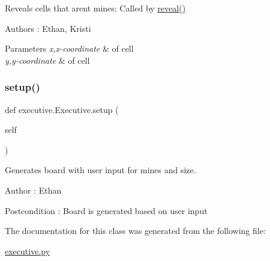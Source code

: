Reveals cells that aren\textquotesingle{}t mines; Called by \mbox{\hyperlink{classexecutive_1_1_executive_a6c8b73fd28d41e64cbd8b259d3c92ae8}{reveal()}} 

\begin{DoxyAuthor}{Authors}
\+: Ethan, Kristi 
\end{DoxyAuthor}

\begin{DoxyParams}{Parameters}
{\em x,x-\/coordinate} & of cell \\
\hline
{\em y,y-\/coordinate} & of cell \\
\hline
\end{DoxyParams}
\mbox{\label{classexecutive_1_1_executive_a45fd19b240299b2f39e9c83d25c47d4a}} 
\subsubsection{\texorpdfstring{setup()}{setup()}}
{\footnotesize\ttfamily def executive.\+Executive.\+setup (\begin{DoxyParamCaption}\item[{}]{self }\end{DoxyParamCaption})}



Generates board with user input for mines and size. 

\begin{DoxyAuthor}{Author}
\+: Ethan 
\end{DoxyAuthor}
\begin{DoxyPostcond}{Postcondition}
\+: Board is generated based on user input 
\end{DoxyPostcond}


The documentation for this class was generated from the following file\+:\begin{DoxyCompactItemize}
\item 
\mbox{\hyperlink{executive_8py}{executive.\+py}}\end{DoxyCompactItemize}
